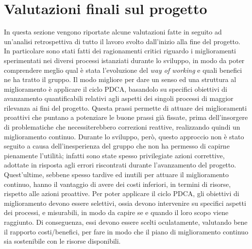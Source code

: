 
\section{Valutazioni finali sul progetto}
	In questa sezione vengono riportate alcune valutazioni fatte in seguito ad un'analisi retrospettiva di tutto il lavoro svolto dall'inizio alla fine del progetto. In particolare sono stati fatti dei ragionamenti critici riguardo i miglioramenti sperimentati nei diversi processi istanziati durante lo sviluppo, in modo da poter comprendere meglio qual è stata l'evoluzione del \textit{way of working} e quali benefici ne ha tratto il gruppo.
	\newline\newline
	Il modo migliore per dare un senso ed una struttura al miglioramento è applicare il ciclo PDCA, basandolo su specifici obiettivi di avanzamento quantificabili relativi agli aspetti dei singoli processi di maggior rilevanza ai fini del progetto. Questa prassi permette di attuare dei miglioramenti proattivi che puntano a potenziare le buone prassi già fissate, prima dell'insorgere di problematiche che necessiterebbero correzioni reattive, realizzando quindi un miglioramento continuo.
	\newline
	Durante lo sviluppo, però, questo approccio non è stato seguito a causa dell'inesperienza del gruppo che non ha permesso di capirne pienamente l'utilità; infatti sono state spesso privilegiate azioni correttive, adottate in risposta agli errori riscontrati durante l'avanzamento del progetto. Quest'ultime, sebbene spesso tardive ed inutili per attuare il miglioramento continuo, hanno il vantaggio di avere dei costi inferiori, in termini di risorse, rispetto alle azioni proattive.
	\newline
	Per poter applicare il ciclo PDCA, gli obiettivi di miglioramento devono essere selettivi, ossia devono intervenire su specifici aspetti dei processi, e misurabili, in modo da capire se e quando il loro scopo viene raggiunto. Di conseguenza, essi devono essere scelti oculatamente, valutando bene il rapporto costi/benefici, per fare in modo che il piano di miglioramento continuo sia sostenibile con le risorse disponibili.
